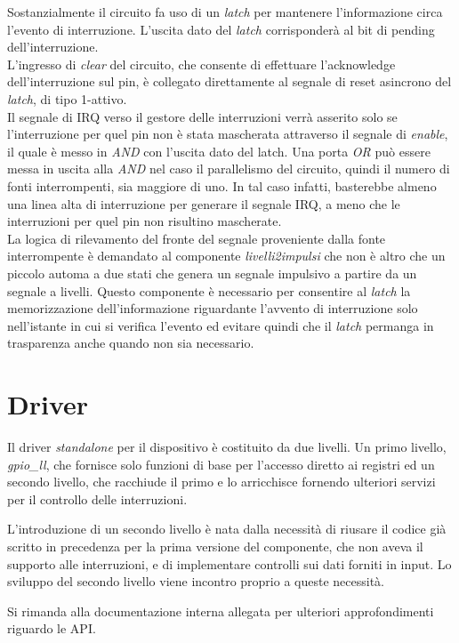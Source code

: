 \documentclass[12pt,a4paper,twoside,openany]{book}
\begin{document}
Sostanzialmente il circuito fa uso di un \textit{latch} per mantenere l'informazione circa l'evento di interruzione. L'uscita dato del \textit{latch} corrisponderà al bit di pending dell'interruzione.\\
L'ingresso di \textit{clear} del circuito, che consente di effettuare l'acknowledge dell'interruzione sul pin, è collegato direttamente al segnale di reset asincrono del \textit{latch}, di tipo 1-attivo.\\
Il segnale di IRQ verso il gestore delle interruzioni verrà asserito solo se l'interruzione per quel pin non è stata mascherata attraverso il segnale di \textit{enable}, il quale è messo in \textit{AND} con l'uscita dato del latch. Una porta \textit{OR} può essere messa in uscita alla \textit{AND} nel caso il parallelismo del circuito, quindi il numero di fonti interrompenti, sia maggiore di uno. In tal caso infatti, basterebbe almeno una linea alta di interruzione per generare il segnale IRQ, a meno che le interruzioni per quel pin non risultino mascherate.\\
La logica di rilevamento del fronte del segnale proveniente dalla fonte interrompente è demandato al componente \textit{livelli2impulsi} che non è altro che un piccolo automa a due stati che genera un segnale impulsivo a partire da un segnale a livelli. Questo componente è necessario per consentire al \textit{latch} la memorizzazione dell'informazione riguardante l'avvento di interruzione solo nell'istante in cui si verifica l'evento ed evitare quindi che il \textit{latch} permanga in trasparenza anche quando non sia necessario.
\section*{Driver}
Il driver \textit{standalone} per il dispositivo è costituito da due livelli. Un primo livello, \textit{gpio\_ll}, che fornisce solo funzioni di base per l'accesso diretto ai registri ed un secondo livello, che racchiude il primo e lo arricchisce fornendo ulteriori servizi per il controllo delle interruzioni.

L'introduzione di un secondo livello è nata dalla necessità di riusare il codice già scritto in precedenza per la prima versione del componente, che non aveva il supporto alle interruzioni, e di implementare controlli sui dati forniti in input. Lo sviluppo del secondo livello viene incontro proprio a queste necessità.

Si rimanda alla documentazione interna allegata per ulteriori approfondimenti riguardo le API.
\end{document}
